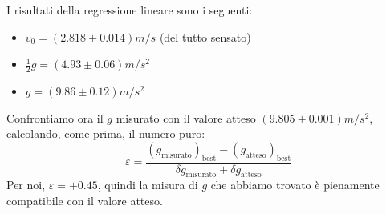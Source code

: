 \documentclass{article}
\newcommand*{\bestp}[1]{{\left(#1\right)}_\text{best}}
\begin{document}
I risultati della regressione lineare sono i seguenti:
\begin{itemize}
    \item $v_0 = \left(2.818\pm0.014\right)\unit{m\per s}$ (del tutto sensato)
    \item $\frac{1}{2} g = \left(4.93\pm0.06\right)\unit{m\per s^2}$
    \item $g = \left(9.86\pm0.12\right)\unit{m\per s^2}$
\end{itemize}

Confrontiamo ora il $g$ misurato con il valore atteso
$\left(9.805 \pm 0.001\right)\unit{m\per s^2}$,
calcolando, come prima, il numero puro: \[
\varepsilon = \frac{\bestp{g_\text{misurato}} - \bestp{g_\text{atteso}}}
                   {\delta g_\text{misurato} + \delta g_\text{atteso}}
\]
Per noi, $\varepsilon = +0.45$, quindi la misura di $g$ che abbiamo
trovato è pienamente compatibile con il valore atteso.
\end{document}
